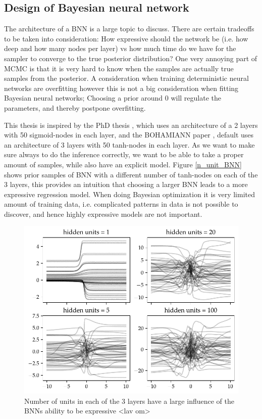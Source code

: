 \subsection{Design of Bayesian neural network}
The architecture of a BNN is a large topic to discuss. There are certain tradeoffs to be taken into
consideration: How expressive should the network be (i.e. how deep and how many nodes per layer) vs
how much time do we have for the sampler to converge to the true posterior distribution? One very
annoying part of MCMC is that it is very hard to know when the samples are actually true samples
from the posterior. A consideration when training deterministic neural networks are overfitting
however this is not a big consideration when fitting Bayesian neural networks; Choosing a prior
around 0 will regulate the parameters, and thereby postpone overfitting. 

This thesis is inspired by the PhD thesis \cite{PhDthesis}, which uses an architecture of a 2 layers
with 50 sigmoid-nodes in each layer, and the BOHAMIANN paper \cite{BOHAMIANN}, default uses an architecture
of 3 layers with 50 tanh-nodes in each layer. As we want to make sure always to do the 
inference correctly, we want to be able to take a proper amount of samples, while also
have an explicit model. Figure \eqref{n_unit_BNN} shows prior samples of BNN with a different
number of tanh-nodes on each of the 3 layers, this provides an intuition that choosing a larger
BNN leads to a more expressive regression model. When doing Bayesian optimization it is very limited
amount of training data, i.e. complicated patterns in data is not possible to discover, and hence 
highly expressive models are not important. 



\begin{figure}[H]
    \centering
    \includegraphics[width=\textwidth]{Pictures/bayesian_nn_prior_samples_hidden_units.pdf}
    \caption{Number of units in each of the 3 layers have a large influence of the BNNs ability to be expressive <lav om>}
    \label{n_unit_BNN}
\end{figure}

